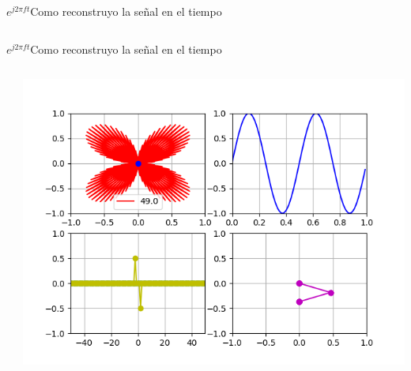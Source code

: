 \begin{frame}{$e^{j2\pi ft}$}{Como reconstruyo la señal en el tiempo}
   \handsonicon
   \begin{columns}[c]
      \hspace{2pt}
      \begin{column}{.5\textwidth}
         
      \end{column}
      \hspace{2pt}
      \vrule
      \hspace{2pt}
      \begin{column}{.5\textwidth}
         
      \end{column}
   \end{columns}
   \vfill
\end{frame}
\begin{frame}{$e^{j2\pi ft}$}{Como reconstruyo la señal en el tiempo}
   \handsonicon
   \begin{columns}[c]
      \hspace{2pt}
      \begin{column}{.5\textwidth}
         
      \end{column}
      \hspace{2pt}
      \vrule
      \hspace{2pt}
      \begin{column}{.4\textwidth}
         \centering\includegraphics[width=1.0\textwidth]{3_clase/euler6}
      \end{column}
      \hspace{2pt}
   \end{columns}
   \vfill
\end{frame}
